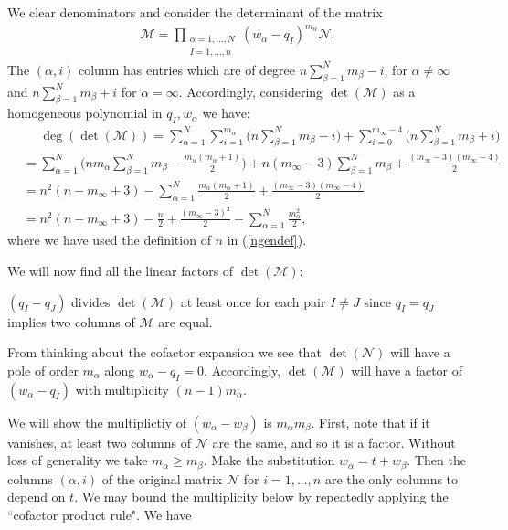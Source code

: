 \documentclass[a4paper,12pt,reqno]{amsart}
\numberwithin{equation}{section}
\numberwithin{counter2}{section}
\begin{document}
We clear denominators and consider the determinant of the matrix
\begin{align}
\mathcal{M} = \prod_{\substack{\alpha = 1,...,N \\ I = 1,...,n}} (w_\alpha - q_I)^{m_\alpha} 
\mathcal{N}.  
 \end{align}
 The $(\alpha,  i)$ column has entries which are of degree $n \sum_{\beta=1}^N  m_\beta - i$,  for $\alpha \ne \infty$ and $n \sum_{\beta=1}^N  m_\beta + i$ for $\alpha = \infty$.  Accordingly,  considering $\det(\mathcal{M})$ as a homogeneous polynomial in $q_I,  w_\alpha$ we have: 
 \begin{align}
 &\phantom{=} \deg(\det(\mathcal{M})) = \sum_{\alpha = 1}^{N} \sum_{i=1}^{m_\alpha} \Big( n \sum_{\beta=1}^N  m_\beta - i\Big) + \sum_{i=0}^{m_\infty-4} \Big(n \sum_{\beta=1}^N  m_\beta + i \Big) \nonumber \\ 
 &=    \sum_{\alpha = 1}^{N} \bigg( nm_\alpha \sum_{\beta=1}^N  m_\beta - \frac{m_\alpha(m_\alpha+1)}{2}\bigg) + n(m_\infty -3) \sum_{\beta=1}^N  m_\beta + \frac{(m_\infty-3)(m_\infty-4)}{2} \nonumber  \\ \nonumber 
 &= n^2(n-m_\infty+3) -  \sum_{\alpha = 1}^{N}  \frac{m_\alpha(m_\alpha+1)}{2}  + \frac{(m_\infty-3)(m_\infty-4)}{2} \\
  &= n^2(n-m_\infty+3)  - \frac{n}{2}+ \frac{(m_\infty-3)^2}{2} -  \sum_{\alpha = 1}^{N}  \frac{m_\alpha^2}{2},   
 \end{align}
 where we have used the definition of $n$ in (\ref{ngendef}).  \par 
 We will now find all the linear factors of $\operatorname{det}(\mathcal{M})$:   \par 
 $(q_I - q_J)$ divides $\det(\mathcal{M})$ at least once for each pair $I \ne J$ since $q_I = q_J$ implies two columns of $\mathcal{M}$ are equal.  \par 
From thinking about the cofactor expansion we see that $\det(\mathcal{N})$ will have a pole of order $m_\alpha$ along $w_\alpha - q_I = 0$.  Accordingly,  $\det(\mathcal{M})$ will have a factor of $(w_\alpha - q_I)$ with multiplicity $(n-1)m_\alpha$.  \par 
We will show the multiplictiy of $(w_\alpha-w_\beta)$ is $m_\alpha m_\beta$.  First,  note that if it vanishes,  at least two columns of $\mathcal{N}$ are the same,  and so it is a factor.  Without loss of generality we take $m_\alpha \ge m_\beta$.  Make the substitution $w_\alpha = t + w_\beta$.  Then the columns $(\alpha,i)$ of the original matrix $\mathcal{N}$ for $i = 1,...,n$ are the only columns to depend on $t$.  We may bound the multiplicity below by repeatedly applying the ``cofactor product rule".  We have
\end{document}
